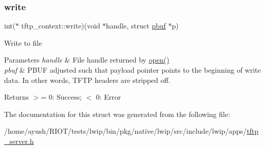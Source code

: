 \subsubsection{\texorpdfstring{write}{write}}
{\footnotesize\ttfamily int($\ast$ tftp\+\_\+context\+::write)(void $\ast$handle, struct \hyperlink{structpbuf}{pbuf} $\ast$p)}

Write to file 
\begin{DoxyParams}{Parameters}
{\em handle} & File handle returned by \hyperlink{structtftp__context_a1115a1fb54634b3e65fe01bb2838daec}{open()} \\
\hline
{\em pbuf} & P\+B\+UF adjusted such that payload pointer points to the beginning of write data. In other words, T\+F\+TP headers are stripped off. \\
\hline
\end{DoxyParams}
\begin{DoxyReturn}{Returns}
$>$= 0\+: Success; $<$ 0\+: Error 
\end{DoxyReturn}


The documentation for this struct was generated from the following file\+:\begin{DoxyCompactItemize}
\item 
/home/ayush/\+R\+I\+O\+T/tests/lwip/bin/pkg/native/lwip/src/include/lwip/apps/\hyperlink{native_2lwip_2src_2include_2lwip_2apps_2tftp__server_8h}{tftp\+\_\+server.\+h}\end{DoxyCompactItemize}
